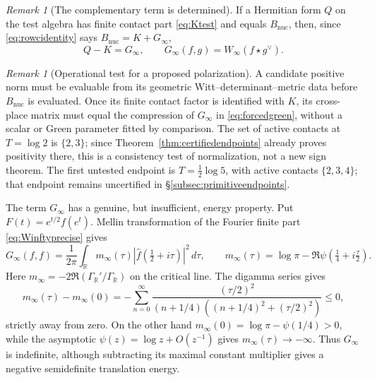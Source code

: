 \documentclass[11pt]{amsart}
\theoremstyle{definition}
\theoremstyle{remark}
\newtheorem{remark}[theorem]{Remark}
\begin{document}
\begin{remark}[The complementary term is determined]
\label{thm:forcedgreen}
If a Hermitian form $Q$ on the test algebra has finite contact part
\eqref{eq:Ktest} and equals $B_{\mathrm{nuc}}$, then, since
\eqref{eq:rowcidentity} says $B_{\mathrm{nuc}}=K+G_\infty$,
\begin{equation}\label{eq:forcedgreen}
 Q-K=G_\infty,\qquad
 G_\infty(f,g)=W_\infty(f\star g^\vee).
\end{equation}
\end{remark}

\begin{remark}[Operational test for a proposed polarization]
\label{rem:operationalpolarizationtest}
A candidate positive norm must be evaluable from its geometric
Witt--determinant--metric data before $B_{\mathrm{nuc}}$ is evaluated.  Once
its finite contact factor is identified with $K$, its cross-place matrix must
equal the compression of $G_\infty$ in \eqref{eq:forcedgreen}, without a
scalar or Green parameter fitted by comparison.  The set of active contacts
at $T=\log2$ is $\{2,3\}$; since Theorem~\ref{thm:certifiedendpoints} already
proves positivity there, this is a consistency test of normalization, not a
new sign theorem.  The first untested endpoint is
$T=\frac12\log5$, with active contacts $\{2,3,4\}$; that endpoint remains
uncertified in \S\ref{subsec:primitiveendpoints}.
\end{remark}

The term \(G_\infty\) has a genuine, but insufficient, energy property.  Put
$F(t)=e^{t/2}f(e^t)$.  Mellin transformation of the Fourier finite part
\eqref{eq:Winftyprecise} gives
\begin{equation}\label{eq:archmultiplier}
 G_\infty(f,f)=\frac1{2\pi}\int_{\mathbb R}m_\infty(\tau)
 |\widehat f(\tfrac12+i\tau)|^2\,d\tau,\qquad
 m_\infty(\tau)=\log\pi-\Re\psi(\tfrac14+i\tfrac\tau2).
\end{equation}
Here $m_\infty=-2\Re(\Gamma_{\mathbb R}'/\Gamma_{\mathbb R})$ on the
critical line.  The digamma series gives
\begin{equation}\label{eq:archenergy}
 m_\infty(\tau)-m_\infty(0)
 =-\sum_{n=0}^\infty
 \frac{(\tau/2)^2}
 {(n+1/4)((n+1/4)^2+(\tau/2)^2)}\le0,
\end{equation}
strictly away from zero.  On the other hand
$m_\infty(0)=\log\pi-\psi(1/4)>0$, while the asymptotic
$\psi(z)=\log z+O(z^{-1})$ gives $m_\infty(\tau)\to-\infty$.
Thus $G_\infty$ is indefinite, although subtracting its maximal constant
multiplier gives a negative semidefinite translation energy.
\end{document}
